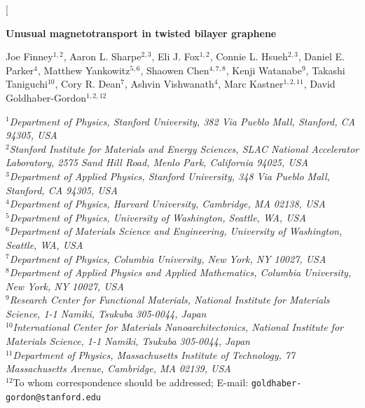 \documentclass[12pt,twocolumn]{article}
\begin{document}
 
\twocolumn[{
\begin{center}
\large\textbf{Unusual magnetotransport in twisted bilayer graphene}
\end{center}

\begin{center}
\small{Joe Finney$^{1,2}$, Aaron L. Sharpe$^{2,3}$, Eli J. Fox$^{1,2}$, Connie L. Hsueh$^{2,3}$, Daniel E. Parker$^4$, Matthew Yankowitz$^{5,6}$, Shaowen Chen$^{4,7,8}$, Kenji Watanabe$^{9}$, Takashi Taniguchi$^{10}$, Cory R. Dean$^7$, Ashvin Vishwanath$^4$, Marc Kastner$^{1,2,11}$, David Goldhaber-Gordon$^{1,2,12}$}
\end{center}

\begin{center}
\footnotesize{$^1$\textit{Department of Physics, Stanford University, 382 Via Pueblo Mall, Stanford, CA 94305, USA}}\\
\footnotesize{$^2$\textit{Stanford Institute for Materials and Energy Sciences, SLAC National Accelerator Laboratory, 2575 Sand Hill Road, Menlo Park, California 94025, USA}}\\
\footnotesize{$^3$\textit{Department of Applied Physics, Stanford University, 348 Via Pueblo Mall, Stanford, CA 94305, USA}}\\
\footnotesize{$^4$\textit{Department of Physics, Harvard University, Cambridge, MA 02138, USA}}\\
\footnotesize{$^5$\textit{Department of Physics, University of Washington, Seattle, WA, USA}}\\
\footnotesize{$^6$\textit{Department of Materials Science and Engineering, University of Washington, Seattle, WA, USA}}\\
\footnotesize{$^7$\textit{Department of Physics, Columbia University, New York, NY 10027, USA}}\\
\footnotesize{$^8$\textit{Department of Applied Physics and Applied Mathematics, Columbia University, New York, NY 10027, USA}}\\
\footnotesize{$^9$\textit{Research Center for Functional Materials, National Institute for Materials Science, 1-1 Namiki, Tsukuba 305-0044, Japan}}\\
\footnotesize{$^{10}$\textit{International Center for Materials Nanoarchitectonics, National Institute for Materials Science,  1-1 Namiki, Tsukuba 305-0044, Japan}}\\
\footnotesize{$^{11}$\textit{Department of Physics, Massachusetts Institute of Technology, 77 Massachusetts Avenue, Cambridge, MA 02139, USA}}\\
\footnotesize{$^{12}$To whom correspondence should be addressed; E-mail: \texttt{goldhaber-gordon@stanford.edu}}
\end{center}

}
\end{document}
